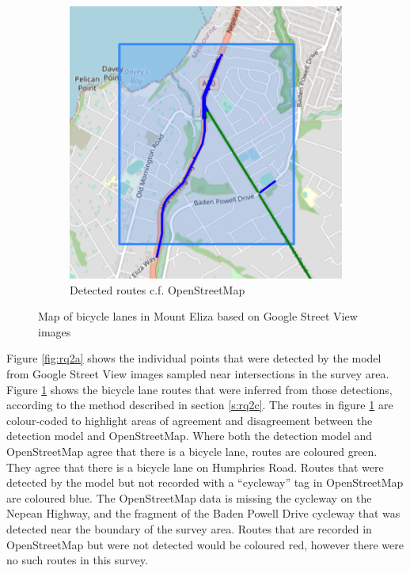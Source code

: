 \documentclass[11pt,twoside]{report}
\begin{document}
\begin{figure}[h]
\begin{subfigure}{0.45\textwidth}
	\includegraphics[width=\textwidth]{map1_4.png}
	\caption{Detected routes c.f. OpenStreetMap}
	\label{fig:rq2b}
\end{subfigure}
\caption{Map of bicycle lanes in Mount Eliza based on Google Street View images}
\label{fig:rq2}
\end{figure}

Figure \ref{fig:rq2a} shows the individual points that were detected by the model from Google Street View images sampled near intersections in the survey area.  Figure \ref{fig:rq2b} shows the bicycle lane routes that were inferred from those detections, according to the method described in section \ref{s:rq2c}.  The routes in figure \ref{fig:rq2b} are colour-coded to highlight areas of agreement and disagreement between the detection model and OpenStreetMap.  Where both the detection model and OpenStreetMap agree that there is a bicycle lane, routes are coloured green.  They agree that there is a bicycle lane on Humphries Road.  Routes that were detected by the model but not recorded with a ``cycleway'' tag in OpenStreetMap are coloured blue.  The OpenStreetMap data is missing the cycleway on the Nepean Highway, and the fragment of the Baden Powell Drive cycleway that was detected near the boundary of the survey area.  Routes that are recorded in OpenStreetMap but were not detected would be coloured red, however there were no such routes in this survey.
\end{document}
